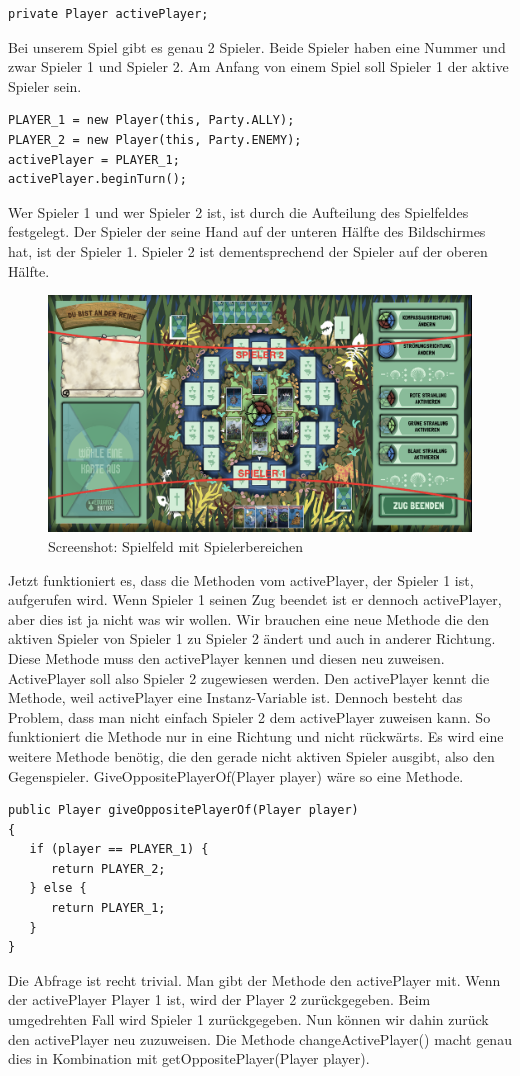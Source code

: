 \begin{lstlisting}
private Player activePlayer;
\end{lstlisting}
Bei unserem Spiel gibt es genau 2 Spieler. Beide Spieler haben eine Nummer und zwar Spieler 1 und Spieler 2. Am Anfang von einem Spiel soll Spieler 1 der aktive Spieler sein.
\begin{lstlisting}
PLAYER_1 = new Player(this, Party.ALLY);
PLAYER_2 = new Player(this, Party.ENEMY);
activePlayer = PLAYER_1;
activePlayer.beginTurn();
\end{lstlisting}
Wer Spieler 1 und wer Spieler 2 ist, ist durch die Aufteilung des Spielfeldes festgelegt. Der Spieler der seine Hand auf der unteren Hälfte des Bildschirmes hat, ist der Spieler 1. Spieler 2 ist dementsprechend der Spieler auf der oberen Hälfte.
\begin{figure}[h]
\includegraphics[width=1\textwidth]{../img/screenshot_spielfeldeinteilung.PNG}
\caption{Screenshot: Spielfeld mit Spielerbereichen}
\label{fig:Screenshot Spielfeld Spielerbereiche}
\end{figure}
Jetzt funktioniert es, dass die Methoden vom activePlayer, der Spieler 1 ist, aufgerufen wird. Wenn Spieler 1 seinen Zug beendet ist er dennoch activePlayer, aber dies ist ja nicht was wir wollen. Wir brauchen eine neue Methode die den aktiven Spieler von Spieler 1 zu Spieler 2 ändert und auch in anderer Richtung.
Diese Methode muss den activePlayer kennen und diesen neu zuweisen. ActivePlayer soll also Spieler 2 zugewiesen werden.
Den activePlayer kennt die Methode, weil activePlayer eine Instanz-Variable ist. Dennoch besteht das Problem, dass man nicht einfach Spieler 2 dem activePlayer zuweisen kann. So funktioniert die Methode nur in eine Richtung und nicht rückwärts. Es wird eine weitere Methode benötig, die den gerade nicht aktiven Spieler ausgibt, also den Gegenspieler. GiveOppositePlayerOf(Player player) wäre so eine Methode.
\begin{lstlisting}
public Player giveOppositePlayerOf(Player player)
{
   if (player == PLAYER_1) {
      return PLAYER_2;
   } else {
      return PLAYER_1;
   }
}
\end{lstlisting}
Die Abfrage ist recht trivial. Man gibt der Methode den activePlayer mit. Wenn der activePlayer Player 1 ist, wird der Player 2 zurückgegeben. Beim umgedrehten Fall wird Spieler 1 zurückgegeben. Nun können wir dahin zurück den activePlayer neu zuzuweisen. Die Methode changeActivePlayer() macht genau dies in Kombination mit getOppositePlayer(Player player).

